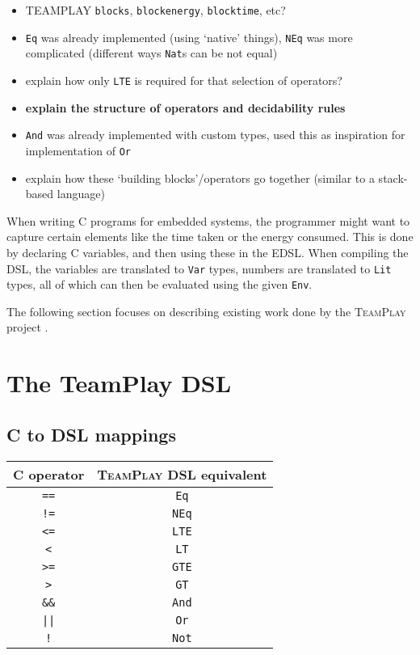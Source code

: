 \begin{itemize}
	\item TEAMPLAY \texttt{blocks}, \texttt{blockenergy}, \texttt{blocktime},
		  etc?
	\item \texttt{Eq} was already implemented (using `native' things),
		  \texttt{NEq} was more complicated (different ways \texttt{Nat}s can be
		  not equal)
	\item explain how only \texttt{LTE} is required for that selection of
		  operators?
    \item \textbf{explain the structure of operators and decidability rules}
	\item \texttt{And} was already implemented with custom types, used this as
		  inspiration for implementation of \texttt{Or}
	\item explain how these `building blocks'/operators go together (similar to
		  a stack-based language)
\end{itemize}

When writing C programs for embedded systems, the programmer might want to capture certain elements like the time taken or the energy consumed. This is done by declaring C variables, and then using these in the EDSL. When compiling the DSL, the variables are translated to \texttt{Var} types, numbers are translated to \texttt{Lit} types, all of which can then be evaluated using the given \texttt{Env}.
\\\par

The following section focuses on describing existing work done by the \textsc{TeamPlay} project \cite{teamplay:d1.1}.

\section{The TeamPlay DSL}
    \subsection{C to DSL mappings}
        \begin{tabular}{c | c}
            \textbf{C operator} &   \textsc{TeamPlay} \textbf{DSL equivalent}   \\
            \hline
            \texttt{==}         &   \texttt{Eq}     \\
            \texttt{!=}         &   \texttt{NEq}    \\
            \texttt{<=}         &   \texttt{LTE}    \\
            \texttt{<}          &   \texttt{LT}     \\
            \texttt{>=}         &   \texttt{GTE}    \\
            \texttt{>}          &   \texttt{GT}     \\
            \texttt{\&\&}       &   \texttt{And}    \\
            \texttt{||}         &   \texttt{Or}     \\
            \texttt{!}          &   \texttt{Not}
        \end{tabular}
    
